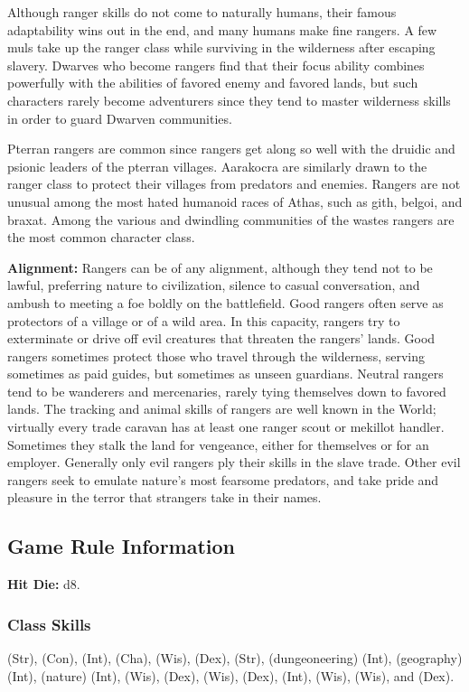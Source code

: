Although ranger skills do not come to naturally humans, their famous adaptability wins out in the end, and many humans make fine rangers. A few muls take up the ranger class while surviving in the wilderness after escaping slavery. Dwarves who become rangers find that their focus ability combines powerfully with the abilities of favored enemy and favored lands, but such characters rarely become adventurers since they tend to master wilderness skills in order to guard Dwarven communities.

Pterran rangers are common since rangers get along so well with the druidic and psionic leaders of the pterran villages. Aarakocra are similarly drawn to the ranger class to protect their villages from predators and enemies. Rangers are not unusual among the most hated humanoid races of Athas, such as gith, belgoi, and braxat. Among the various and dwindling communities of the wastes rangers are the most common character class.

\textbf{Alignment:} Rangers can be of any alignment, although they tend not to be lawful, preferring nature to civilization, silence to casual conversation, and ambush to meeting a foe boldly on the battlefield. Good rangers often serve as protectors of a village or of a wild area. In this capacity, rangers try to exterminate or drive off evil creatures that threaten the rangers' lands. Good rangers sometimes protect those who travel through the wilderness, serving sometimes as paid guides, but sometimes as unseen guardians. Neutral rangers tend to be wanderers and mercenaries, rarely tying themselves down to favored lands. The tracking and animal skills of rangers are well known in the World; virtually every trade caravan has at least one ranger scout or mekillot handler. Sometimes they stalk the land for vengeance, either for themselves or for an employer. Generally only evil rangers ply their skills in the slave trade. Other evil rangers seek to emulate nature's most fearsome predators, and take pride and pleasure in the terror that strangers take in their names.

\subsection{Game Rule Information}

\textbf{Hit Die:} d8.

\subsubsection{Class Skills}
 (Str),  (Con),  (Int),  (Cha),  (Wis),  (Dex),  (Str),  (dungeoneering) (Int),  (geography) (Int),  (nature) (Int),  (Wis),  (Dex),  (Wis),  (Dex),  (Int),  (Wis),  (Wis), and  (Dex).

